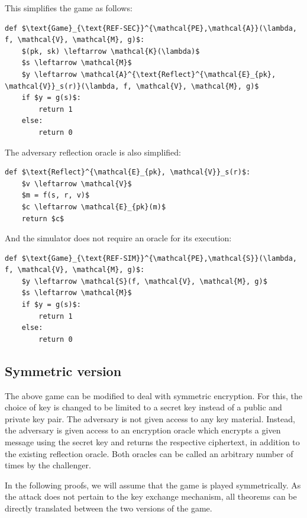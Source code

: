 \documentclass{sig-alternate-05-2015}
\begin{document}
This simplifies the game as follows:

\begin{lstlisting}[texcl,mathescape]
def $\text{Game}_{\text{REF-SEC}}^{\mathcal{PE},\mathcal{A}}(\lambda, f, \mathcal{V}, \mathcal{M}, g)$:
    $(pk, sk) \leftarrow \mathcal{K}(\lambda)$
    $s \leftarrow \mathcal{M}$
    $y \leftarrow \mathcal{A}^{\text{Reflect}^{\mathcal{E}_{pk}, \mathcal{V}}_s(r)}(\lambda, f, \mathcal{V}, \mathcal{M}, g)$
    if $y = g(s)$:
        return 1
    else:
        return 0
\end{lstlisting}

The adversary reflection oracle is also simplified:

\begin{lstlisting}[texcl,mathescape]
def $\text{Reflect}^{\mathcal{E}_{pk}, \mathcal{V}}_s(r)$:
    $v \leftarrow \mathcal{V}$
    $m = f(s, r, v)$
    $c \leftarrow \mathcal{E}_{pk}(m)$
    return $c$
\end{lstlisting}

And the simulator does not require an oracle for its execution:

\begin{lstlisting}[texcl,mathescape]
def $\text{Game}_{\text{REF-SIM}}^{\mathcal{PE},\mathcal{S}}(\lambda, f, \mathcal{V}, \mathcal{M}, g)$:
    $y \leftarrow \mathcal{S}(f, \mathcal{V}, \mathcal{M}, g)$
    $s \leftarrow \mathcal{M}$
    if $y = g(s)$:
        return 1
    else:
        return 0
\end{lstlisting}

\subsection{Symmetric version}\label{subsec:refsecsym}

The above game can be modified to deal with symmetric encryption. For this, the
choice of key is changed to be limited to a secret key instead of a public and
private key pair. The adversary is not given access to any key material.
Instead, the adversary is given access to an encryption oracle which encrypts a
given message using the secret key and returns the respective ciphertext, in
addition to the existing reflection oracle. Both oracles can be called an
arbitrary number of times by the challenger.

In the following proofs, we will assume that the game is played symmetrically.
As the attack does not pertain to the key exchange mechanism, all theorems can
be directly translated between the two versions of the game.
\end{document}
